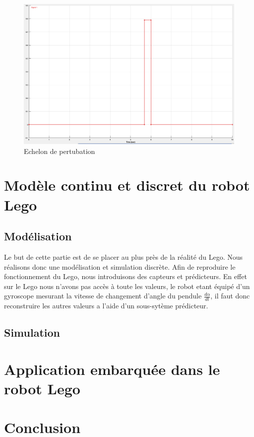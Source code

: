 \documentclass[11pt]{article}
\begin{document}
\begin{figure}[h!]
	\includegraphics[scale=0.2]{images/pendule_inverse_perturbation}
	\caption{Echelon de pertubation}
\end{figure}
\section{Modèle continu et discret du robot Lego}
\subsection{Modélisation}
Le but de cette partie est de se placer au plus près de la réalité du Lego. Nous réalisons donc une modélisation et simulation discrète. Afin de reproduire le fonctionnement du Lego, nous introduisons des capteurs et prédicteurs. En effet sur le Lego nous n'avons pas accès à toute les valeurs, le robot etant équipé d'un gyroscope mesurant la vitesse de changement d'angle du pendule $\frac{d\alpha}{dt}$, il faut donc reconstruire les autres valeurs a l'aide d'un sous-sytème prédicteur.
\subsection{Simulation}

\section{Application embarquée dans le robot Lego}

\section*{Conclusion}
\end{document}

